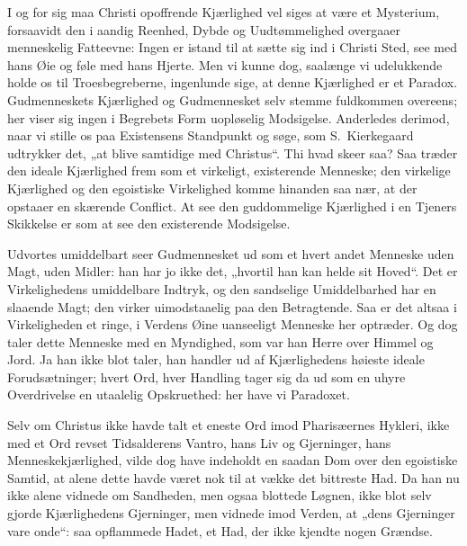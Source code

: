 \documentclass[12pt]{book}
\begin{document}
I og for sig maa Christi opoffrende Kjærlighed vel siges at være et
Mysterium, forsaavidt den i aandig Reenhed, Dybde og
Uudtømmelighed overgaaer menneskelig Fatteevne: Ingen er istand til
at sætte sig ind i Christi Sted, see med hans Øie og føle med hans
Hjerte. Men vi kunne dog, saalænge vi udelukkende holde os til
Troesbegreberne, ingenlunde sige, at denne Kjærlighed er et Paradox.
Gudmenneskets Kjærlighed og Gudmennesket selv stemme fuldkommen
overeens; her viser sig ingen i
Begrebets Form uopløselig Modsigelse. Anderledes derimod, naar vi
stille os paa Existensens Standpunkt og søge, som S.\ Kierkegaard
udtrykker det, „at blive samtidige med Christus“. Thi hvad skeer
saa? Saa træder den ideale Kjærlighed frem som et virkeligt,
existerende Menneske; den virkelige Kjærlighed og den egoistiske
Virkelighed komme hinanden saa nær, at der opstaaer en skærende
Conflict. At see den guddommelige Kjærlighed i en Tjeners Skikkelse
er som at see den existerende Modsigelse.

Udvortes umiddelbart seer Gudmennesket ud som et hvert andet
Menneske uden Magt, uden Midler: han har jo ikke det, „hvortil han
kan helde sit Hoved“. Det er Virkelighedens umiddelbare Indtryk, og
den sandselige Umiddelbarhed har en slaaende Magt; den virker
uimodstaaelig paa den Betragtende. Saa er det altsaa i Virkeligheden
et ringe, i Verdens Øine uanseeligt Menneske her optræder. Og dog
taler dette Menneske med en Myndighed, som var han Herre over Himmel
og Jord. Ja han ikke blot taler, han handler ud af Kjærlighedens
høieste ideale Forudsætninger; hvert Ord, hver Handling tager sig da
ud som en uhyre Overdrivelse en utaalelig Opskruethed: her have vi
Paradoxet.

Selv om Christus ikke havde talt et eneste Ord imod Pharisæernes
Hykleri, ikke med et Ord revset Tidsalderens Vantro, hans Liv og
Gjerninger, hans Menneskekjærlighed, vilde dog have indeholdt en
saadan Dom over den egoistiske Samtid, at alene dette havde været
nok til at vække det bittreste Had. Da han nu ikke alene vidnede om
Sandheden, men ogsaa blottede Løgnen, ikke blot selv gjorde
Kjærlighedens Gjerninger, men vidnede imod Verden, at „dens
Gjerninger vare onde“: saa opflammede Hadet, et Had, der ikke
kjendte nogen Grændse.
\end{document}

